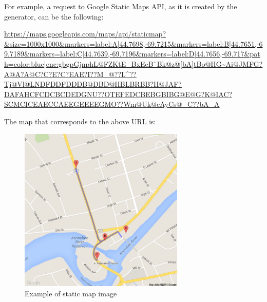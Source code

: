 For example, a request to Google Static Maps API, 
as it is created by the generator, can be the following:
\begin{center}
\url{https://maps.googleapis.com/maps/api/staticmap?&size=1000x1000&markers=label:A|44.7698,-69.7215&markers=label:B|44.7651,-69.7189&markers=label:C|44.7639,-69.7196&markers=label:D|44.7656,-69.717&path=color:blue|enc:gbgpGjnphL@FZKtE_BxEeB`Bk@z@[bA]tBo@HG~Ai@JMFG?A@A?A@C?C?E?C?EAE?I??M_@??L^??Tj@Vl@LNDFDDFDDDB@DBD@HBLBRBB?H@JAF?DAFAHCFCDCBCDEDGNU??OTEFEDCBEBGBIBG@E@G?K@IAC?SCMCICEAECCAEEGEEEEGMO??Wm@Uk@cAyCs@_C??bA_A}
\end{center}
The map that corresponds to the above URL is:

\begin{figure}[H]
  \centering
  \includegraphics[width=0.7\textwidth]{figures/staticmap.png}
  \caption{Example of static map image}
\end{figure}









